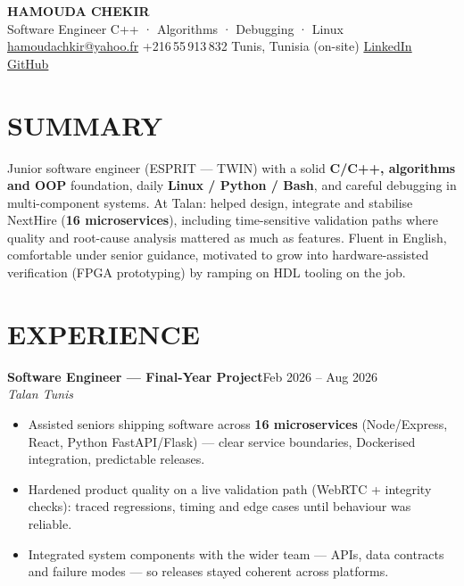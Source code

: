 \documentclass[10pt,a4paper]{article}
\newcommand{\TargetTitle}{Software Engineer \textbar{} C++ · Algorithms · Debugging · Linux}
\newcommand{\job}[3]{%
  \textbf{\color{primary}#1}\hfill{\color{muted}\small #2}\\[-1pt]
  {\color{accent}\textit{#3}}\\[1pt]
  \begin{itemize}
}
\newcommand{\contactsep}{\hspace{4pt}{\color{rulecolor}|}\hspace{4pt}}
\begin{document}
{\fontsize{20}{24}\selectfont\bfseries\color{primary}HAMOUDA CHEKIR}\\[1pt]
{\normalsize\color{accent}\TargetTitle}\\[3pt]
{\footnotesize\color{muted}%
  \hspace{2pt}\href{mailto:hamoudachkir@yahoo.fr}{hamoudachkir@yahoo.fr}%
  \contactsep
  \hspace{2pt}+216\,55\,913\,832%
  \contactsep
  \hspace{2pt}Tunis, Tunisia (on-site)%
  \contactsep
  \hspace{2pt}\href{https://www.linkedin.com/in/hamouda-chekir-5053572b4}{LinkedIn}%
  \contactsep
  \hspace{2pt}\href{https://github.com/hamoudachekir}{GitHub}%
}\\[4pt]

\section{SUMMARY}
Junior software engineer (ESPRIT — TWIN) with a solid \textbf{C/C++, algorithms and OOP} foundation, daily \textbf{Linux / Python / Bash}, and careful debugging in multi-component systems.
At Talan: helped design, integrate and stabilise NextHire (\textbf{16 microservices}), including time-sensitive validation paths where quality and root-cause analysis mattered as much as features.
Fluent in English, comfortable under senior guidance, motivated to grow into hardware-assisted verification (FPGA prototyping) by ramping on HDL tooling on the job.

\section{EXPERIENCE}

\job{Software Engineer — Final-Year Project}{Feb 2026 -- Aug 2026}{Talan \textbar{} Tunis}
  \item Assisted seniors shipping software across \textbf{16 microservices} (Node/Express, React, Python FastAPI/Flask) — clear service boundaries, Dockerised integration, predictable releases.
  \item Hardened product quality on a live validation path (WebRTC + integrity checks): traced regressions, timing and edge cases until behaviour was reliable.
  \item Integrated system components with the wider team — APIs, data contracts and failure modes — so releases stayed coherent across platforms.
\end{itemize}
\end{document}
